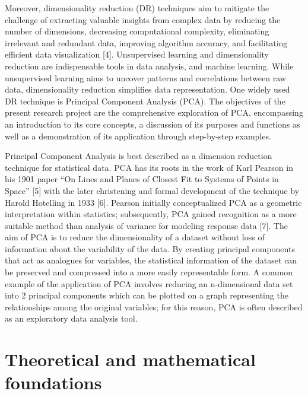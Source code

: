 \documentclass[
  letterpaper,
  DIV=11,
  numbers=noendperiod]{scrreprt}
\begin{document}
Moreover, dimensionality reduction (DR) techniques aim to mitigate the
challenge of extracting valuable insights from complex data by reducing
the number of dimensions, decreasing computational complexity,
eliminating irrelevant and redundant data, improving algorithm accuracy,
and facilitating efficient data visualization {[}4{]}. Unsupervised
learning and dimensionality reduction are indispensable tools in data
analysis, and machine learning. While unsupervised learning aims to
uncover patterns and correlations between raw data, dimensionality
reduction simplifies data representation. One widely used DR technique
is Principal Component Analysis (PCA). The objectives of the present
research project are the comprehensive exploration of PCA, encompassing
an introduction to its core concepts, a discussion of its purposes and
functions as well as a demonstration of its application through
step-by-step examples.

Principal Component Analysis is best described as a dimension reduction
technique for statistical data. PCA has its roots in the work of Karl
Pearson in his 1901 paper ``On Lines and Planes of Closest Fit to
Systems of Points in Space'' {[}5{]} with the later christening and
formal development of the technique by Harold Hotelling in 1933 {[}6{]}.
Pearson initially conceptualized PCA as a geometric interpretation
within statistics; subsequently, PCA gained recognition as a more
suitable method than analysis of variance for modeling response data
{[}7{]}. The aim of PCA is to reduce the dimensionality of a dataset
without loss of information about the variability of the data. By
creating principal components that act as analogues for variables, the
statistical information of the dataset can be preserved and compressed
into a more easily representable form. A common example of the
application of PCA involves reducing an n-dimensional data set into 2
principal components which can be plotted on a graph representing the
relationships among the original variables; for this reason, PCA is
often described as an exploratory data analysis tool.

\hypertarget{theoretical-and-mathematical-foundations}{%
\section{Theoretical and mathematical
foundations}\label{theoretical-and-mathematical-foundations}}
\end{document}
